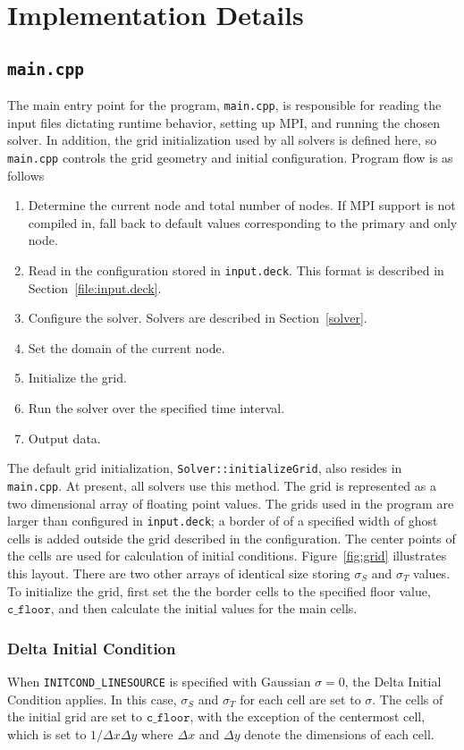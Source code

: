 \documentclass{article}
\newcommand{\main}{\texttt{main.cpp}\xspace}
\newcommand{\inputdeck}{\texttt{input.deck}\xspace}
\newcommand{\floor}{\ensuremath{\mathtt{c\_floor}}\xspace}
\begin{document}
\section{Implementation Details}
\subsection{\main}
\label{src:main.cpp}
The main entry point for the program, \main, is responsible for reading the input
files dictating runtime behavior, setting up MPI, and running the chosen solver.
In addition, the grid initialization used by all solvers is defined here, so \main
controls the grid geometry and initial configuration. Program flow is as follows
\begin{enumerate}
    \item Determine the current node and total number of nodes. If MPI support is not
    compiled in, fall back to default values corresponding to the primary and
    only node.
    \item Read in the configuration stored in \inputdeck. This format is
    described in Section~\ref{file:input.deck}.
    \item Configure the solver. Solvers are described in Section~\ref{solver}.
    \item Set the domain of the current node.
    \item Initialize the grid.
    \item Run the solver over the specified time interval.
    \item Output data.
\end{enumerate}

The default grid initialization, \texttt{Solver::initializeGrid}, also resides
in \main. At present, all solvers use this
method. The grid is represented as a two dimensional array of floating point values.
The grids used in the program are larger than configured in \inputdeck; a border of
of a specified width of ghost cells is added outside the grid described in the
configuration.  The center points of the cells are used for calculation of
initial conditions. Figure~\ref{fig:grid} illustrates this layout.
There are two other arrays of identical size storing $\sigma_S$ and $\sigma_T$
values. To initialize the grid, first set the the border cells to the
specified floor value, \floor, and then calculate the initial values for the
main cells.

\subsubsection{Delta Initial Condition}
\label{init:delta}
When \texttt{INITCOND\_LINESOURCE} is specified with Gaussian $\sigma=0$, the
Delta Initial Condition applies. In this case, $\sigma_S$ and $\sigma_T$ for each
cell are set to $\sigma$. The cells of the initial grid are set to \floor,
with the exception of the centermost cell, %
which is set to $1 / \Delta x \Delta y$ where $\Delta x$ and $\Delta y$ denote the
dimensions of each cell.
\end{document}
